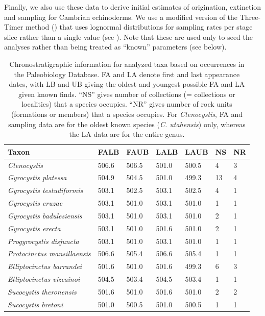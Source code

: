 \documentclass{article}
\begin{document}
Finally, we also use these data to derive initial estimates of origination, extinction and sampling for Cambrian echinoderms.  We use a modified version of the Three-Timer method (\citep{Alroy2015}) that uses lognormal distributions for sampling rates per stage slice rather than a single value (see \citep{Wagner2013}).  Note that these are used only to seed the analyses rather than being treated as “known” parameters (see below).

\begin{table}[]
\caption{Chronostratigraphic information for analyzed taxa based on occurrences in the Paleobiology Database.  FA and LA denote first and last appearance dates, with LB and UB giving the oldest and youngest possible FA and LA given known finds. “NS” gives number of collections (= collections or localities) that a species occupies.  “NR” gives number of rock units (formations or members) that a species occupies.  For \textit{Ctenocystis}, FA and sampling data are for the oldest known species (\textit{C. utahensis}) only, whereas the LA data are for the entire genus.}
\begin{tabular}{l|llIIlI}
Taxon      & FALB & FAUB & LALB & LAUB & NS & NR \\ \hline
\textit{Ctenocystis} & 506.6 & 506.5 & 501.0 & 500.5 & 4 & 3\\
\textit{Gyrocystis platessa} & 504.9 & 504.5 & 501.0 & 499.3 & 13 & 4\\
\textit{Gyrocystis testudiformis} & 503.1 & 502.5 & 503.1 & 502.5 & 4 & 1\\
\textit{Gyrocystis cruzae} & 503.1 & 501.0 & 503.1 & 501.0 & 1 & 1\\
\textit{Gyrocystis badulesiensis} & 503.1 & 501.0 & 503.1 & 501.0 & 2 & 1\\
\textit{Gyrocystis erecta} & 503.1 & 501.0 & 501.6 & 501.0 & 2 & 1\\
\textit{Progyrocystis disjuncta} & 503.1 & 501.0 & 503.1 & 501.0 & 1 & 1\\
\textit{Protocinctus mansillaensis} & 506.6 & 505.4 & 506.6 & 505.4 & 1 & 1\\
\textit{Elliptocinctus barrandei} & 501.6 & 501.0 & 501.6 & 499.3 & 6 & 3\\
\textit{Elliptocinctus vizcainoi} & 504.5 & 503.4 & 504.5 & 503.4 & 1 & 1\\
\textit{Sucocystis theronensis} & 501.6 & 501.0 & 501.6 & 501.0 & 2 & 2\\
\textit{Sucocystis bretoni} & 501.0 & 500.5 & 501.0 & 500.5 & 1 & 1\\

\end{tabular}
\end{table}
\end{document}

